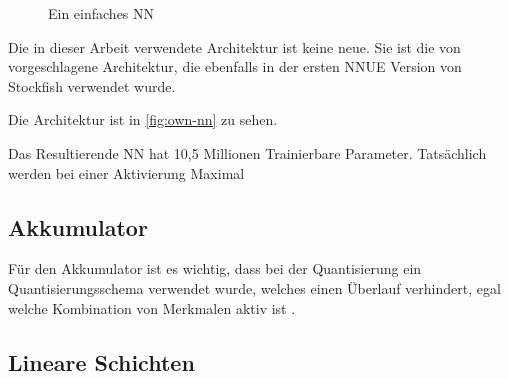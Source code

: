 \begin{figure}
{
  }%
  \caption{Ein einfaches \acl{NN}}
  \label{fig:own-nn}
\end{figure}

Die in dieser Arbeit verwendete Architektur ist keine neue. Sie ist die von \citeauthor{YNasu2018} \cite{YNasu2018} vorgeschlagene Architektur, die ebenfalls in der ersten \ac{NNUE} Version von Stockfish verwendet wurde.

Die Architektur ist in \autoref{fig:own-nn} zu sehen.


Das Resultierende \ac{NN} hat 10,5 Millionen Trainierbare Parameter. Tatsächlich werden bei einer Aktivierung Maximal


\subsection{Akkumulator}


Für den Akkumulator ist es wichtig, dass bei der Quantisierung ein Quantisierungsschema verwendet wurde, welches einen Überlauf verhindert, egal welche Kombination von Merkmalen aktiv ist \cite{StockfishNNUE}.

\subsection{Lineare Schichten}


